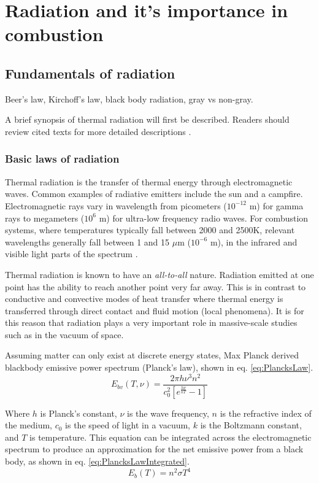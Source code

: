 \addchapheadtotoc
\chapter{Radiation and it's importance in combustion}\label{chapter:Importance}

\section{Fundamentals of radiation} \label{Sec:FundOfRad}
Beer's law, Kirchoff's law, black body radiation, gray vs non-gray.


A brief synopsis of thermal radiation will first be described. Readers should review cited texts for more detailed descriptions \cite{Howell2010ThermalTransfer,Modest2013RadiativeTransfer}.

\subsection{Basic laws of radiation}
Thermal radiation is the transfer of thermal energy through electromagnetic waves. Common examples of radiative emitters include the sun and a campfire. Electromagnetic rays vary in wavelength from picometers ($10^{-12}$ m) for gamma rays to megameters ($10^6$ m) for ultra-low frequency radio waves. For combustion systems, where temperatures typically fall between 2000 and 2500K, relevant wavelengths generally fall between 1 and 15 $\mu{}$m ($10^{-6}$ m), in the infrared and visible light parts of the spectrum \cite{Liu2020TheFlames}.

Thermal radiation is known to have an \textit{all-to-all} nature. Radiation emitted at one point has the ability to reach another point very far away. 
This is in contrast to conductive and convective modes of heat transfer where thermal energy is transferred through direct contact and fluid motion (local phenomena). 
It is for this reason that radiation plays a very important role in massive-scale studies such as in the vacuum of space.

Assuming matter can only exist at discrete energy states, Max Planck derived blackbody emissive power spectrum (Planck's law), shown in eq. \ref{eq:PlancksLaw}.
\begin{equation}
    E_{bv}(T,\nu{}) = \frac{2\pi{}h\nu{}^3n^2}{c_0^2\left[e^\frac{h\nu{}}{kT}-1\right]}
    \label{eq:PlancksLaw}
\end{equation}

Where $h$ is Planck's constant, $\nu{}$ is the wave frequency, $n$ is the refractive index of the medium, $c_0$ is the speed of light in a vacuum, $k$ is the Boltzmann constant, and $T$ is temperature. This equation can be integrated across the electromagnetic spectrum to produce an approximation for the net emissive power from a black body, as shown in eq. \ref{eq:PlancksLawIntegrated}.
\begin{equation}
    E_b(T) = n^2\sigma{}T^4
    \label{eq:PlancksLawIntegrated}
\end{equation}

